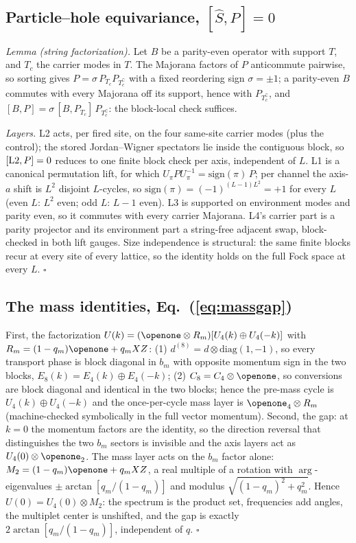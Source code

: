 \documentclass[aps,prd,twocolumn,superscriptaddress,nofootinbib,floatfix]{revtex4-2}
\begin{document}
\subsection{Particle--hole equivariance, $[\hat S,P]=0$}

\emph{Lemma (string factorization).} Let $B$ be a parity-even operator
with support $T$, and $T_c$ the carrier modes in $T$. The Majorana
factors of $P$ anticommute pairwise, so sorting gives
$P=\sigma\,P_{T_c}P_{T_c^\complement}$ with a fixed reordering sign
$\sigma=\pm1$; a parity-even $B$ commutes with every Majorana off its
support, hence with $P_{T_c^\complement}$, and
$[B,P]=\sigma\,[B,P_{T_c}]\,P_{T_c^\complement}$: the block-local check
suffices.

\emph{Layers.} L2 acts, per fired site, on the four same-site carrier
modes (plus the control); the stored Jordan--Wigner spectators lie
inside the contiguous block, so $[{\rm L2},P]=0$ reduces to one finite
block check per axis, independent of $L$. L1 is a canonical permutation
lift, for which $U_\pi PU_\pi^{-1}=\mathrm{sign}(\pi)\,P$; per channel
the axis-$a$ shift is $L^2$ disjoint $L$-cycles, so
$\mathrm{sign}(\pi)=(-1)^{(L-1)L^2}=+1$ for every $L$ (even $L$: $L^2$
even; odd $L$: $L-1$ even). L3 is supported on environment modes and
parity even, so it commutes with every carrier Majorana. L4's carrier
part is a parity projector and its environment part a string-free
adjacent swap, block-checked in both lift gauges. Size independence is
structural: the same finite blocks recur at every site of every
lattice, so the identity holds on the full Fock space at every $L$.
\hfill$\square$

\subsection{The mass identities, Eq.~(\ref{eq:massgap})}

First, the factorization
$U(k)=(\openone\otimes R_m)[U_4(k)\oplus U_4(-k)]$ with
$R_m=(1-q_m)\openone+q_mXZ$: (1)
$d^{(8)}=d\otimes\mathrm{diag}(1,-1)$, so every transport phase is
block diagonal in $b_m$ with opposite momentum sign in the two blocks,
$E_8(k)=E_4(k)\oplus E_4(-k)$; (2) $C_8=C_4\otimes\openone$, so
conversions are block diagonal and identical in the two blocks; hence
the pre-mass cycle is $U_4(k)\oplus U_4(-k)$ and the once-per-cycle
mass layer is $\openone_4\otimes R_m$ (machine-checked symbolically in
the full vector momentum). Second, the gap:
at $k=0$ the momentum factors are the identity, so the direction reversal
that distinguishes the two $b_m$ sectors is invisible and the axis layers
act as $U_4(0)\otimes\openone_2$. The mass layer acts on the $b_m$ factor
alone: $M_2=(1-q_m)\openone+q_m XZ$, a real multiple of a rotation with
$\arg$-eigenvalues $\pm\arctan[q_m/(1-q_m)]$ and modulus
$\sqrt{(1-q_m)^2+q_m^2}$. Hence
$U(0)=U_4(0)\otimes M_2$: the spectrum is the product set, frequencies add
angles, the multiplet center is unshifted, and the gap is exactly
$2\arctan[q_m/(1-q_m)]$, independent of $q$. \hfill$\square$
\end{document}
